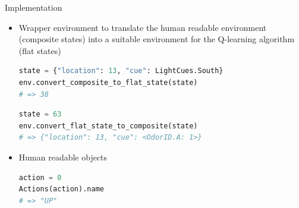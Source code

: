 \documentclass[bigger]{beamer}
\begin{document}
\begin{frame}[<+->][label={sec:org3e4e6f7},fragile]{Implementation}
\begin{itemize}
\item Wrapper environment to translate the human readable environment (\alert{composite states}) into a suitable environment for the Q-learning algorithm (\alert{flat states})
\scriptsize
\begin{lstlisting}[language={Python}]
state = {"location": 13, "cue": LightCues.South}
env.convert_composite_to_flat_state(state)
# => 38
\end{lstlisting}
\begin{lstlisting}[language={Python}]
state = 63
env.convert_flat_state_to_composite(state)
# => {"location": 13, "cue": <OdorID.A: 1>}
\end{lstlisting}
\item Human readable objects
\scriptsize
\begin{lstlisting}[language={Python}]
action = 0
Actions(action).name
# => "UP"
\end{lstlisting}
\end{itemize}
\end{frame}
\end{document}
